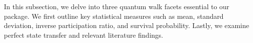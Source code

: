\documentclass[../../main.tex]{subfiles}
\begin{document}
In this subsection, we delve into three quantum walk facets essential to our
package. We first outline key statistical measures such as mean, standard
deviation, inverse participation ratio, and survival probability.  Lastly, we
examine perfect state transfer and relevant literature findings.
\end{document}
